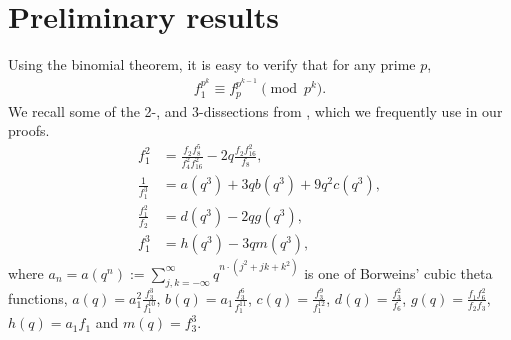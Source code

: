 \documentclass[12pt,reqno,a4paper]{amsart}
\numberwithin{equation}{section}
\begin{document}
\section{Preliminary results}\label{Sec2}
Using the binomial theorem, it is easy to verify that for any prime $p$, 
\begin{align}
  \label{B1}  f_1^{p^k}\equiv f_p^{p^{k-1}}\pmod{p^k}.
\end{align}
  We recall some of the 2-, and 3-dissections from \cite{poq}, which we frequently use in our proofs.
    \begin{align}
     \label{D1}   f_1^2 &= \frac{f_2f_8^5}{f_4^2f_{16}^2}-2q\frac{f_2f_{16}^2}{f_8},\\
     \label{D4}\frac{1}{f_1^3}&  = a(q^3)+3qb(q^3)+9q^2c(q^3),\\
     \label{D3}\frac{f_1^2}{f_2}& = d(q^3)-2qg(q^3),\\
     \label{D2} f_1^3 & = h(q^3)-3qm(q^3),
    \end{align}
    where $a_n=a(q^n):=\displaystyle\sum_{j,k=-\infty}^\infty q^{n\cdot(j^2+jk+k^2)}$ is one of Borweins' cubic theta functions, $a(q)=a_1^2\frac{f_3^3}{f_1^{10}}$, $b(q)=a_1\frac{f_3^6}{f_1^{11}}$, $c(q)=\frac{f_3^9}{f_1^{12}}$, $ d(q)=\frac{f_3^2}{f_6}$, $g(q)=\frac{f_1f_6^2}{f_2f_3}$, $h(q)=a_1f_1$ and $m(q)=f_3^3$.
\end{document}
